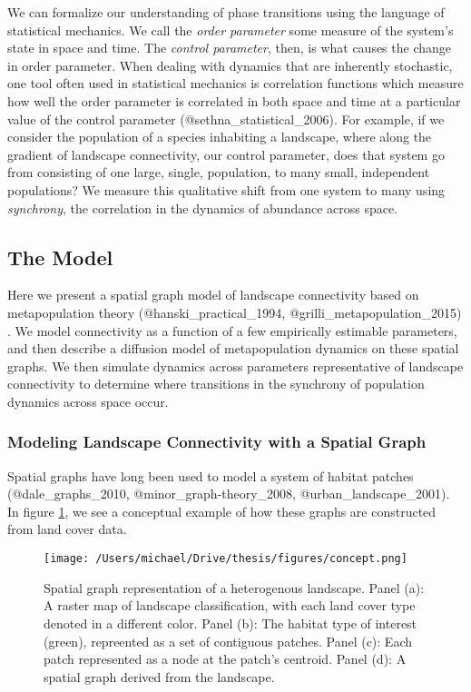 We can formalize our understanding of phase transitions using the
language of statistical mechanics. We call the \emph{order parameter}
some measure of the system's state in space and time. The \emph{control
parameter}, then, is what causes the change in order parameter. When
dealing with dynamics that are inherently stochastic, one tool often
used in statistical mechanics is correlation functions which measure how
well the order parameter is correlated in both space and time at a
particular value of the control parameter (@sethna\_statistical\_2006).
For example, if we consider the population of a species inhabiting a
landscape, where along the gradient of landscape connectivity, our
control parameter, does that system go from consisting of one large,
single, population, to many small, independent populations? We measure
this qualitative shift from one system to many using \emph{synchrony},
the correlation in the dynamics of abundance across space.

\pagebreak

\hypertarget{the-model}{%
\subsection{The Model}\label{the-model}}

Here we present a spatial graph model of landscape connectivity based on
metapopulation theory (@hanski\_practical\_1994,
@grilli\_metapopulation\_2015) . We model connectivity as a function of
a few empirically estimable parameters, and then describe a diffusion
model of metapopulation dynamics on these spatial graphs. We then
simulate dynamics across parameters representative of landscape
connectivity to determine where transitions in the synchrony of
population dynamics across space occur.

\hypertarget{modeling-landscape-connectivity-with-a-spatial-graph}{%
\subsubsection{Modeling Landscape Connectivity with a Spatial
Graph}\label{modeling-landscape-connectivity-with-a-spatial-graph}}

Spatial graphs have long been used to model a system of habitat patches
(@dale\_graphs\_2010, @minor\_graph-theory\_2008,
@urban\_landscape\_2001). In figure \ref{concept}, we see a conceptual
example of how these graphs are constructed from land cover data.

\begin{figure}[h]

\texttt{[image: /Users/michael/Drive/thesis/figures/concept.png]}

\caption{Spatial graph representation of a heterogenous landscape. Panel (a): A raster map of landscape classification, with each land cover type denoted in a different color. Panel (b): The habitat type of interest (green), repreented as a set of contiguous patches. Panel (c): Each patch represented as a node at the patch's centroid. Panel (d): A spatial graph derived from the landscape. }

\label{concept}

\end{figure}

